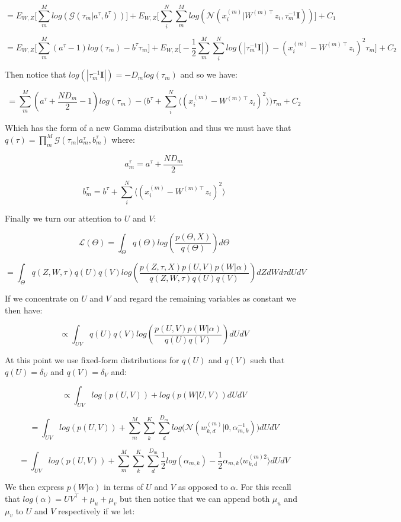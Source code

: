 \documentclass{article}
\begin{document}
$$ = E_{W,Z}\bigg[\sum_m^M{log(\mathcal{G}(\tau_m|a^\tau,b^\tau))}\bigg] +  E_{W,Z}\bigg[\sum_i^N{\sum_m^M{log(\mathcal{N}(x_i^{(m)}|W^{(m)\intercal}z_i, \tau_m^{-1}\textbf{I}))}}\bigg]+C_1$$

$$ = E_{W,Z}\bigg[\sum_m^M{(a^\tau-1)log(\tau_m) - b^\tau\tau_m}\bigg] + E_{W,Z}\bigg[-\frac{1}{2}\sum_m^M{\sum_i^N{log(|\tau_m^{-1}\textbf{I}|) - (x_i^{(m)}-W^{(m)\intercal}z_i)^2\tau_m}}\bigg]+C_2$$

Then notice that $log(|\tau_m^{-1}\textbf{I}|) =  -D_mlog(\tau_m)$ and so we have:

$$ = \sum_m^M{(a^\tau + \frac{ND_m}{2} - 1)log(\tau_m) - \bigg(b^\tau + \sum_i^N{\bigg\langle(x_i^{(m)}-W^{(m)\intercal}z_i)^2\bigg\rangle}\bigg)\tau_m}+C_2$$

Which has the form of a new Gamma distribution and thus we must have that $q(\tau) = \prod_m^M{\mathcal{G}(\tau_m|a_m^\tau,b_m^\tau)}$ where:

$$a_m^\tau = a^\tau + \frac{ND_m}{2}$$

$$b_m^\tau = b^\tau + \sum_i^N{\bigg\langle(x_i^{(m)}-W^{(m)\intercal}z_i)^2\bigg\rangle}$$

Finally we turn our attention to $U$ and $V$:

$$\mathcal{L}(\Theta) = \int_\Theta{q(\Theta)log(\frac{p(\Theta,X)}{q(\Theta)})d\Theta}$$

$$= \int_\Theta{ q(Z,W,\tau)q(U)q(V)log(\frac{p(Z,\tau,X)p(U,V)p(W|\alpha)}{q(Z,W,\tau)q(U)q(V)})dZdWd\tau dUdV}$$

If we concentrate on $U$ and $V$ and regard the remaining variables as constant we then have:

$$ \propto \int_{UV}{q(U)q(V)log(\frac{p(U,V)p(W|\alpha)}{q(U)q(V)})dUdV}$$

At this point we use fixed-form distributions for $q(U)$ and $q(V)$ such that $q(U)=\delta_U$ and $q(V) = \delta_V$ and:

$$ \propto \int_{UV}{log(p(U,V)) + log(p(W|U,V)) dUdV}$$

$$ = \int_{UV}{log(p(U,V)) + \sum_m^M{\sum_k^K{\sum_d^{D_m}{log\Big(\mathcal{N}(w_{k,d}^{(m)}|0,\alpha_{m,k}^{-1})\Big)}}}dUdV}$$

$$ = \int_{UV}{log(p(U,V)) + \sum_m^M{\sum_k^K{\sum_d^{D_m}{\frac{1}{2}log(\alpha_{m,k}) - \frac{1}{2}\alpha_{m,k}\langle w_{k,d}^{(m)2}\rangle }}}dUdV}$$

We then express $p(W|\alpha)$ in terms of $U$ and $V$ as opposed to $\alpha$. For this recall that $log(\alpha) = UV^\intercal + \mu_u + \mu_v$ but then notice that we can append both $\mu_u$ and $\mu_v$ to $U$ and $V$ respectively if we let:
\end{document}
